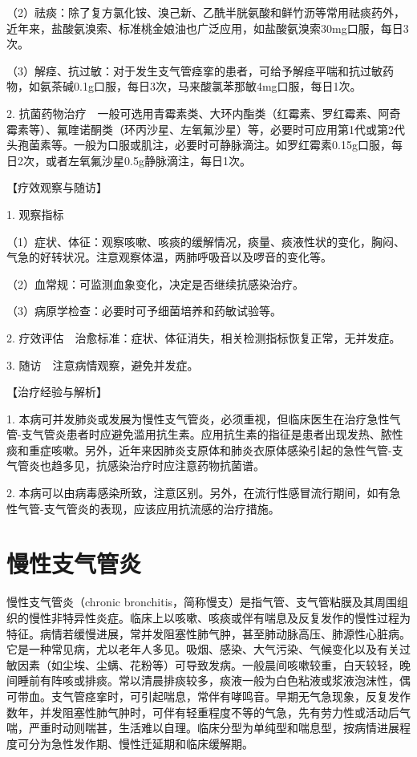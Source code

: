 （2）祛痰：除了复方氯化铵、溴己新、乙酰半胱氨酸和鲜竹沥等常用祛痰药外，近年来，盐酸氨溴索、标准桃金娘油也广泛应用，如盐酸氨溴索30mg口服，每日3次。

（3）解痉、抗过敏：对于发生支气管痉挛的患者，可给予解痉平喘和抗过敏药物，如氨茶碱0.1g口服，每日3次，马来酸氯苯那敏4mg口服，每日1次。

2.
抗菌药物治疗　一般可选用青霉素类、大环内酯类（红霉素、罗红霉素、阿奇霉素等）、氟喹诺酮类（环丙沙星、左氧氟沙星）等，必要时可应用第1代或第2代头孢菌素等。一般为口服或肌注，必要时可静脉滴注。如罗红霉素0.15g口服，每日2次，或者左氧氟沙星0.5g静脉滴注，每日1次。

【疗效观察与随访】

1. 观察指标

（1）症状、体征：观察咳嗽、咳痰的缓解情况，痰量、痰液性状的变化，胸闷、气急的好转状况。注意观察体温，两肺呼吸音以及啰音的变化等。

（2）血常规：可监测血象变化，决定是否继续抗感染治疗。

（3）病原学检查：必要时可予细菌培养和药敏试验等。

2. 疗效评估　治愈标准：症状、体征消失，相关检测指标恢复正常，无并发症。

3. 随访　注意病情观察，避免并发症。

【治疗经验与解析】

1.
本病可并发肺炎或发展为慢性支气管炎，必须重视，但临床医生在治疗急性气管-支气管炎患者时应避免滥用抗生素。应用抗生素的指征是患者出现发热、脓性痰和重症咳嗽。另外，近年来因肺炎支原体和肺炎衣原体感染引起的急性气管-支气管炎也趋多见，抗感染治疗时应注意药物抗菌谱。

2.
本病可以由病毒感染所致，注意区别。另外，在流行性感冒流行期间，如有急性气管-支气管炎的表现，应该应用抗流感的治疗措施。


\section{慢性支气管炎}

慢性支气管炎（chronic
bronchitis，简称慢支）是指气管、支气管粘膜及其周围组织的慢性非特异性炎症。临床上以咳嗽、咳痰或伴有喘息及反复发作的慢性过程为特征。病情若缓慢进展，常并发阻塞性肺气肿，甚至肺动脉高压、肺源性心脏病。它是一种常见病，尤以老年人多见。吸烟、感染、大气污染、气候变化以及有关过敏因素（如尘埃、尘螨、花粉等）可导致发病。一般晨间咳嗽较重，白天较轻，晚间睡前有阵咳或排痰。常以清晨排痰较多，痰液一般为白色粘液或浆液泡沫性，偶可带血。支气管痉挛时，可引起喘息，常伴有哮鸣音。早期无气急现象，反复发作数年，并发阻塞性肺气肿时，可伴有轻重程度不等的气急，先有劳力性或活动后气喘，严重时动则喘甚，生活难以自理。临床分型为单纯型和喘息型，按病情进展程度可分为急性发作期、慢性迁延期和临床缓解期。

